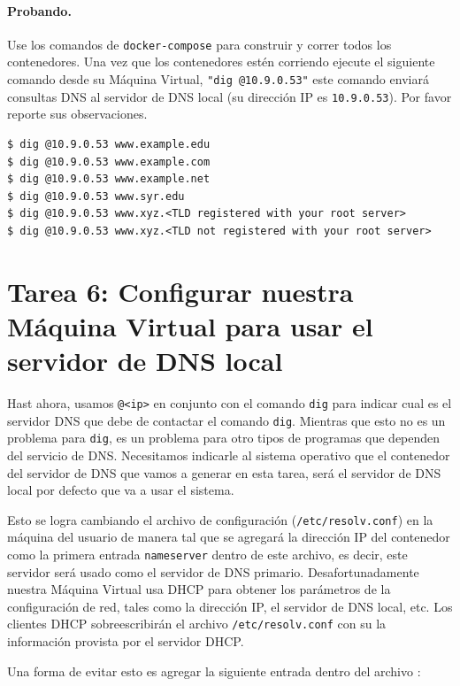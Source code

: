 \paragraph{Probando.} Use los comandos de \texttt{docker-compose} para construir y correr todos los contenedores.
Una vez que los contenedores estén corriendo ejecute el siguiente comando desde su Máquina Virtual, \texttt{"dig @10.9.0.53"} este comando enviará consultas DNS al servidor de DNS local (su dirección IP es  \texttt{10.9.0.53}).
Por favor reporte sus observaciones.

\begin{lstlisting}
$ dig @10.9.0.53 www.example.edu
$ dig @10.9.0.53 www.example.com
$ dig @10.9.0.53 www.example.net
$ dig @10.9.0.53 www.syr.edu
$ dig @10.9.0.53 www.xyz.<TLD registered with your root server>
$ dig @10.9.0.53 www.xyz.<TLD not registered with your root server>
\end{lstlisting}



\section{Tarea 6: Configurar nuestra Máquina Virtual para usar el servidor de DNS local} 

Hast ahora, usamos \texttt{@<ip>} en conjunto con el comando \texttt{dig} para indicar cual es el servidor DNS que debe de contactar el comando \texttt{dig}. Mientras que esto no es un problema para \texttt{dig}, es un problema para otro tipos de programas que dependen del servicio de DNS. Necesitamos indicarle al sistema operativo que el contenedor del servidor de DNS que vamos a generar en esta tarea, será el servidor de DNS local por defecto que va a usar el sistema.

Esto se logra cambiando el archivo de configuración (\texttt{/etc/resolv.conf}) en la máquina del usuario de manera tal que se agregará la dirección IP del contenedor como la primera entrada \texttt{nameserver} dentro de este archivo, es decir, este servidor será usado como el servidor de DNS primario.
Desafortunadamente nuestra Máquina Virtual usa DHCP para obtener los parámetros de la configuración de red, tales como la dirección IP, el servidor de DNS local, etc. Los clientes DHCP sobreescribirán el archivo \texttt{/etc/resolv.conf} con su la información provista por el servidor DHCP.

Una forma de evitar esto es agregar la siguiente entrada dentro del archivo :

